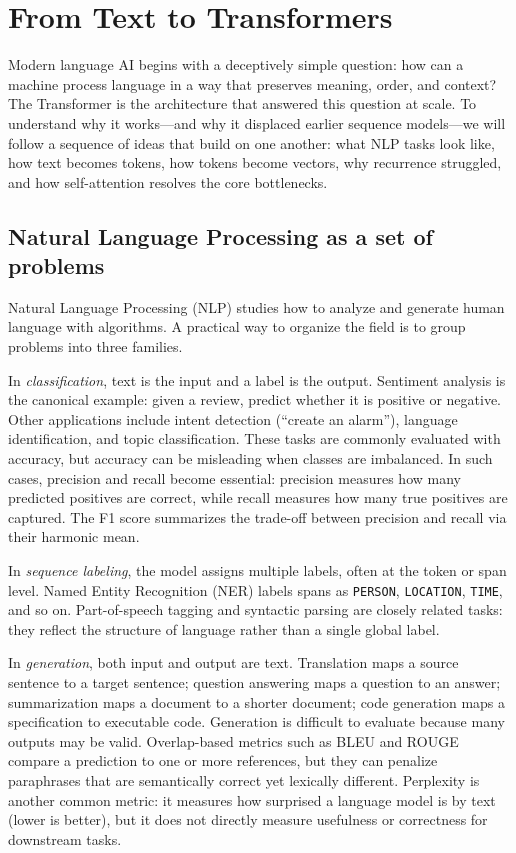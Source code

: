 
\chapter{From Text to Transformers}
\label{chap:from-text-to-transformers}

Modern language AI begins with a deceptively simple question: how can a machine process language in a way that preserves meaning, order, and context? The Transformer is the architecture that answered this question at scale. To understand why it works—and why it displaced earlier sequence models—we will follow a sequence of ideas that build on one another: what NLP tasks look like, how text becomes tokens, how tokens become vectors, why recurrence struggled, and how self-attention resolves the core bottlenecks.

\section{Natural Language Processing as a set of problems}
Natural Language Processing (NLP) studies how to analyze and generate human language with algorithms. A practical way to organize the field is to group problems into three families.

In \emph{classification}, text is the input and a label is the output. Sentiment analysis is the canonical example: given a review, predict whether it is positive or negative. Other applications include intent detection (“create an alarm”), language identification, and topic classification. These tasks are commonly evaluated with accuracy, but accuracy can be misleading when classes are imbalanced. In such cases, precision and recall become essential: precision measures how many predicted positives are correct, while recall measures how many true positives are captured. The F1 score summarizes the trade-off between precision and recall via their harmonic mean.

In \emph{sequence labeling}, the model assigns multiple labels, often at the token or span level. Named Entity Recognition (NER) labels spans as \texttt{PERSON}, \texttt{LOCATION}, \texttt{TIME}, and so on. Part-of-speech tagging and syntactic parsing are closely related tasks: they reflect the structure of language rather than a single global label.

In \emph{generation}, both input and output are text. Translation maps a source sentence to a target sentence; question answering maps a question to an answer; summarization maps a document to a shorter document; code generation maps a specification to executable code. Generation is difficult to evaluate because many outputs may be valid. Overlap-based metrics such as BLEU and ROUGE compare a prediction to one or more references, but they can penalize paraphrases that are semantically correct yet lexically different. Perplexity is another common metric: it measures how surprised a language model is by text (lower is better), but it does not directly measure usefulness or correctness for downstream tasks.

